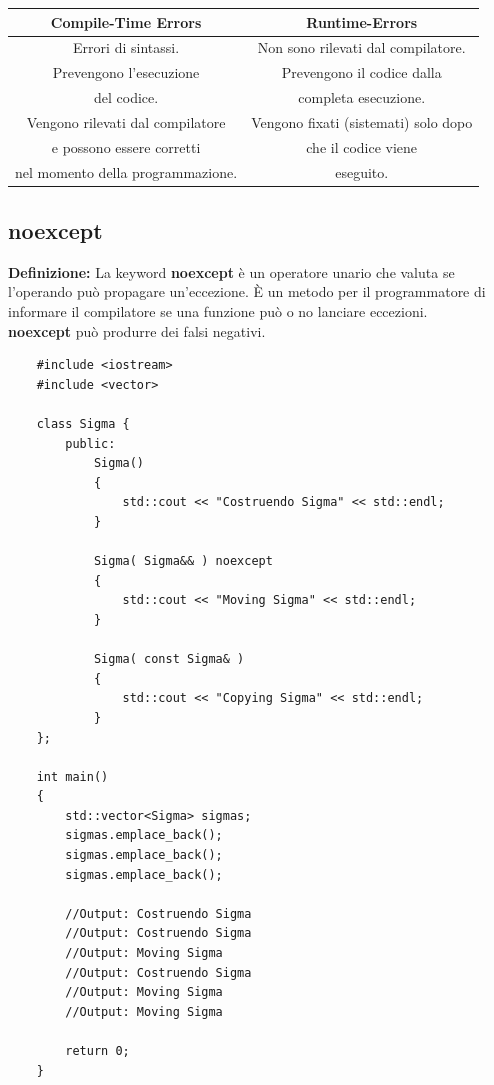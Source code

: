 \begin{tabular}{|c|c|}
	\hline
	\textbf{Compile-Time Errors} & \textbf{Runtime-Errors} \\
	\hline
	\textsf{\small Errori di sintassi.} & \textsf{\small Non sono rilevati dal compilatore.} \\
	\hline
	\textsf{\small Prevengono l'esecuzione } & \textsf{\small Prevengono il codice dalla } \\
	\textsf{\small del codice.} & \textsf{\small completa esecuzione.} \\
	\hline
	\textsf{\small Vengono rilevati dal compilatore } & \textsf{\small Vengono fixati (sistemati) solo dopo} \\
	\textsf{\small e possono essere corretti} & \textsf{\small che il codice viene} \\
	\textsf{\small nel momento della programmazione.} & \textsf{\small eseguito.} \\
	\hline
\end{tabular}

\subsection{noexcept}

\textsf{\small \textbf{Definizione: } La keyword \textbf{noexcept} è un operatore unario che valuta se l'operando può propagare un'eccezione. È un metodo per il programmatore di informare il compilatore se una funzione può o no lanciare eccezioni.} \\

\textsf{\small \textbf{noexcept} può produrre dei falsi negativi.} \\

\begin{lstlisting}
	#include <iostream>
	#include <vector>
	
	class Sigma {
		public:
			Sigma()
			{
				std::cout << "Costruendo Sigma" << std::endl;
			}
		
			Sigma( Sigma&& ) noexcept
			{
				std::cout << "Moving Sigma" << std::endl;
 			}
 		
 			Sigma( const Sigma& )
 			{
 				std::cout << "Copying Sigma" << std::endl;
 			}
	};

	int main()
	{
		std::vector<Sigma> sigmas;
		sigmas.emplace_back();
		sigmas.emplace_back();
		sigmas.emplace_back();
		
		//Output: Costruendo Sigma
		//Output: Costruendo Sigma
		//Output: Moving Sigma
		//Output: Costruendo Sigma
		//Output: Moving Sigma
		//Output: Moving Sigma
		
		return 0;
	}
\end{lstlisting}

